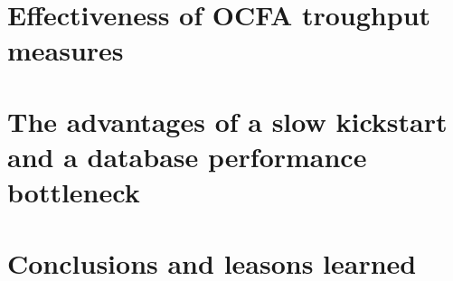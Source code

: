 \section{Effectiveness of OCFA troughput measures}

\section{The advantages of a slow kickstart and a database performance bottleneck}

\section{Conclusions and leasons learned}
